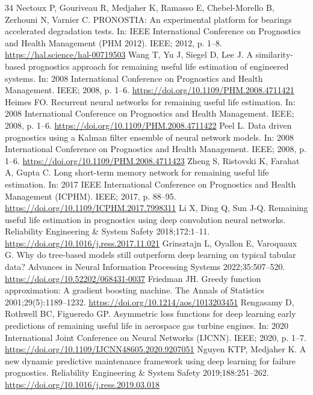 \documentclass[a4paper,fleqn,doubleblind]{cas-dc}
\begin{document}
\begin{thebibliography}{34}
 Nectoux P, Gouriveau R, Medjaher K, Ramasso E, Chebel-Morello B, Zerhouni N, Varnier C. PRONOSTIA: An experimental platform for bearings accelerated degradation tests. In: IEEE International Conference on Prognostics and Health Management (PHM 2012). IEEE; 2012, p. 1--8. \url{https://hal.science/hal-00719503}
 Wang T, Yu J, Siegel D, Lee J. A similarity-based prognostics approach for remaining useful life estimation of engineered systems. In: 2008 International Conference on Prognostics and Health Management. IEEE; 2008, p. 1--6. \url{https://doi.org/10.1109/PHM.2008.4711421}
 Heimes FO. Recurrent neural networks for remaining useful life estimation. In: 2008 International Conference on Prognostics and Health Management. IEEE; 2008, p. 1--6. \url{https://doi.org/10.1109/PHM.2008.4711422}
 Peel L. Data driven prognostics using a Kalman filter ensemble of neural network models. In: 2008 International Conference on Prognostics and Health Management. IEEE; 2008, p. 1--6. \url{https://doi.org/10.1109/PHM.2008.4711423}
 Zheng S, Ristovski K, Farahat A, Gupta C. Long short-term memory network for remaining useful life estimation. In: 2017 IEEE International Conference on Prognostics and Health Management (ICPHM). IEEE; 2017, p. 88--95. \url{https://doi.org/10.1109/ICPHM.2017.7998311}
 Li X, Ding Q, Sun J-Q. Remaining useful life estimation in prognostics using deep convolution neural networks. Reliability Engineering \& System Safety 2018;172:1--11. \url{https://doi.org/10.1016/j.ress.2017.11.021}
 Grinsztajn L, Oyallon E, Varoquaux G. Why do tree-based models still outperform deep learning on typical tabular data? Advances in Neural Information Processing Systems 2022;35:507--520. \url{https://doi.org/10.52202/068431-0037}
 Friedman JH. Greedy function approximation: A gradient boosting machine. The Annals of Statistics 2001;29(5):1189--1232. \url{https://doi.org/10.1214/aos/1013203451}
 Rengasamy D, Rothwell BC, Figueredo GP. Asymmetric loss functions for deep learning early predictions of remaining useful life in aerospace gas turbine engines. In: 2020 International Joint Conference on Neural Networks (IJCNN). IEEE; 2020, p. 1--7. \url{https://doi.org/10.1109/IJCNN48605.2020.9207051}
 Nguyen KTP, Medjaher K. A new dynamic predictive maintenance framework using deep learning for failure prognostics. Reliability Engineering \& System Safety 2019;188:251--262. \url{https://doi.org/10.1016/j.ress.2019.03.018}

\end{thebibliography}
\end{document}
